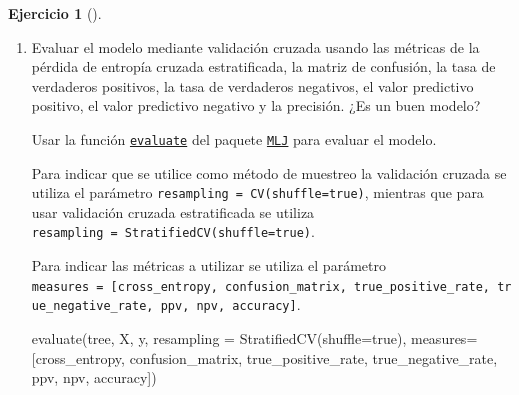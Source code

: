 \documentclass[
  a4paper,
]{scrreport}
\newenvironment{Shaded}{\begin{snugshade}}{\end{snugshade}}
\newcommand{\ConstantTok}[1]{\textcolor[rgb]{0.56,0.35,0.01}{#1}}
\newcommand{\FunctionTok}[1]{\textcolor[rgb]{0.28,0.35,0.67}{#1}}
\newcommand{\NormalTok}[1]{\textcolor[rgb]{0.00,0.23,0.31}{#1}}
\newcommand{\OperatorTok}[1]{\textcolor[rgb]{0.37,0.37,0.37}{#1}}
\theoremstyle{definition}
\newtheorem{exercise}{Ejercicio}[chapter]
\theoremstyle{remark}
\begin{document}
\begin{exercise}[]
\begin{enumerate}
\begin{tcolorbox}
  \end{tcolorbox}
\item
  Evaluar el modelo mediante validación cruzada usando las métricas de
  la pérdida de entropía cruzada estratificada, la matriz de confusión,
  la tasa de verdaderos positivos, la tasa de verdaderos negativos, el
  valor predictivo positivo, el valor predictivo negativo y la
  precisión. ¿Es un buen modelo?

  \begin{tcolorbox}[enhanced jigsaw, toptitle=1mm, colframe=quarto-callout-note-color-frame, titlerule=0mm, left=2mm, arc=.35mm, colbacktitle=quarto-callout-note-color!10!white, opacityback=0, bottomtitle=1mm, toprule=.15mm, coltitle=black, breakable, colback=white, rightrule=.15mm, opacitybacktitle=0.6, leftrule=.75mm, bottomrule=.15mm, title=\textcolor{quarto-callout-note-color}{\faInfo}\hspace{0.5em}{Ayuda}]

  Usar la función
  \href{https://juliaai.github.io/MLJ.jl/stable/evaluating_model_performance/\#MLJBase.evaluate!}{\texttt{evaluate}}
  del paquete \href{https://juliaai.github.io/MLJ.jl/}{\texttt{MLJ}}
  para evaluar el modelo.

  Para indicar que se utilice como método de muestreo la validación
  cruzada se utiliza el parámetro
  \texttt{resampling\ =\ CV(shuffle=true)}, mientras que para usar
  validación cruzada estratificada se utiliza
  \texttt{resampling\ =\ StratifiedCV(shuffle=true)}.

  Para indicar las métricas a utilizar se utiliza el parámetro
  \texttt{measures\ =\ {[}cross\_entropy,\ confusion\_matrix,\ true\_positive\_rate,\ true\_negative\_rate,\ ppv,\ npv,\ accuracy{]}}.

  \end{tcolorbox}

  \begin{tcolorbox}[enhanced jigsaw, toptitle=1mm, colframe=quarto-callout-tip-color-frame, titlerule=0mm, left=2mm, arc=.35mm, colbacktitle=quarto-callout-tip-color!10!white, opacityback=0, bottomtitle=1mm, toprule=.15mm, coltitle=black, breakable, colback=white, rightrule=.15mm, opacitybacktitle=0.6, leftrule=.75mm, bottomrule=.15mm, title=\textcolor{quarto-callout-tip-color}{\faLightbulb}\hspace{0.5em}{Solución}]

\begin{Shaded}
\begin{Highlighting}[]
\FunctionTok{evaluate}\NormalTok{(tree, X, y, resampling }\OperatorTok{=} \FunctionTok{StratifiedCV}\NormalTok{(shuffle}\OperatorTok{=}\ConstantTok{true}\NormalTok{), measures}\OperatorTok{=}\NormalTok{[cross\_entropy, confusion\_matrix, true\_positive\_rate, true\_negative\_rate, ppv, npv, accuracy])}
\end{Highlighting}
\end{Shaded}


\end{tcolorbox}
\end{enumerate}
\end{exercise}
\end{document}

